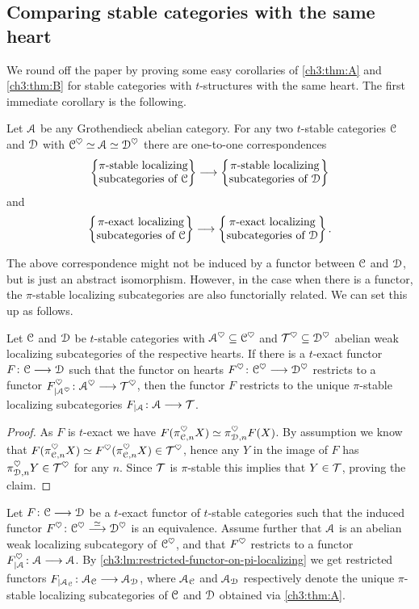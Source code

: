 \subsection{Comparing stable categories with the same heart}

We round off the paper by proving some easy corollaries of \cref{ch3:thm:A} and \cref{ch3:thm:B} for stable categories with $t$-structures with the same heart. The first immediate corollary is the following. 

\begin{corollary}
    Let $\A$ be any Grothendieck abelian category. For any two $t$-stable categories $\C$ and $\D$ with $\C^\heart \simeq \A\simeq \D^\heart$ there are one-to-one correspondences
    \[\pistable\to\pistableD\]
    and 
    \[\piexact\to \piexactD.\]
\end{corollary}

The above correspondence might not be induced by a functor between $\C$ and $\D$, but is just an abstract isomorphism. However, in the case when there is a functor, the $\pi$-stable localizing subcategories are also functorially related. We can set this up as follows. 

\begin{lemma}
    \label{ch3:lm:restricted-functor-on-pi-localizing}
    Let $\C$ and $\D$ be $t$-stable categories with $\A^\heart\subseteq \C^\heart$ and $\T^\heart\subseteq \D^\heart$ abelian weak localizing subcategories of the respective hearts. If there is a $t$-exact functor $F\:\C\to \D$ such that the functor on hearts $F^\heart\: \C^\heart\to \D^\heart$ restricts to a functor $F^\heart_{\vert \A^\heart}\: \A^\heart \to \T^\heart$, then the functor $F$ restricts to the unique $\pi$-stable localizing subcategories $F_{\vert \A}\:\A\to \T$. 
\end{lemma}
\begin{proof}
    As $F$ is $t$-exact we have $F(\pi_{\C,n}^\heart X)\simeq \pi_{\D, n}^\heart F(X)$. By assumption we know that $F(\pi_{\C,n}^{\heart}X) \simeq F^\heart(\pi_{\C,n}^\heart X) \in \T^\heart$, hence any $Y$ in the image of $F$ has $\pi_{\D,n}^\heart Y \in \T^\heart$ for any $n$. Since $\T$ is $\pi$-stable this implies that $Y\in \T$, proving the claim.
\end{proof}

Let $F\:\C\to\D$ be a $t$-exact functor of $t$-stable categories such that the induced functor $F^\heart \: \C^\heart\overset{\simeq}\to \D^\heart$ is an equivalence. Assume further that $\A$ is an abelian weak localizing subcategory of $\C^\heart$, and that $F^\heart$ restricts to a functor $F^\heart_{\vert \A}\:\A\to\A$. By \cref{ch3:lm:restricted-functor-on-pi-localizing} we get restricted functors $F_{\vert \A_\C}\: \A_\C \to \A_\D$, where $\A_\C$ and $\A_\D$ respectively denote the unique $\pi$-stable localizing subcategories of $\C$ and $\D$ obtained via \cref{ch3:thm:A}.

